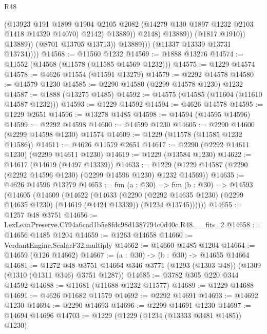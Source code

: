 \begin{lexlean}{R48}
\begin{coremodule}
                                  (@13923
                                    @191
                                    @1899
                                    @1904
                                    @2105
                                    @2082
                                    (@14279 @130 @1897 @1232 @2103 @1418 @14320 @14070)
                                    @2142)
                                  @13889))
                              @2148)
                            @13889))
                        (@1817 @1910))
                      @13889))
                  (@8701 @13705 @13713))
                @13889)))
          (@11337 @13339 @13731 @13734))))
@14568 := @11560 @1232
@14569 := @1888 @13276
@14574 := @11552 (@14568 (@11578 (@11585 @14569 @1232)))
@14575 := @1229 @14574
@14578 := @4626 @11554 (@11591 @13279)
@14579 := @2292 @14578
@14580 := @14579 @1230
@14585 := @2290 @14580 (@2299 @14578 @1230) @1232
@14587 := @1888 (@13275 @1485)
@14592 := @14575 (@14585 (@11604 (@11610 @14587 @1232)))
@14593 := @1229 @14592
@14594 := @4626 @14578
@14595 := @1229 @2651
@14596 := @13278 @1485
@14598 := @14594 (@14595 @14596)
@14599 := @2292 @14598
@14600 := @14599 @1230
@14605 := @2290 @14600 (@2299 @14598 @1230) @11574
@14609 := @1229 (@11578 (@11585 @1232 @11586))
@14611 := @4626 @11579 @2651
@14617 := @2290 (@2292 @14611 @1230) (@2299 @14611 @1230)
@14619 := @1229 (@13584 @1230)
@14622 := @14617 (@14619 (@4497 @13339))
@14633 := @1229 (@1229 @14587 (@2290 (@2292 @14596 @1230) (@2299 @14596 @1230) @1232 @14569))
@14635 := @4626 @14596 @13279
@14653 := fun (a : @30) =>
  fun (b : @30) =>
  @14593
    (@14605
      (@14609
        (@14622
          (@14633
            (@2290
              (@2292 @14635 @1230)
              (@2299 @14635 @1230)
              (@14619 (@4424 @13339))
              (@1234 @13745))))))
@14655 := @1257 @48 @3751
@14656 := LexLeanPreserve.C794a6cad1b5e8fdc98d1387794c0d40c.R48.__fits_2
@14658 := @14656 @1485 @1204
@14659 := @1263 @14658
@14660 := VerdantEngine.ScalarF32.multiply
@14662 := @14660 @1485 @1204
@14664 := @14659 (@126 @14662)
@14667 := (a : @30) -> (b : @30) -> @14655 @14664
@14681 := @1272
    @48
    @3751
    @14664
    @346
    @3771
    (@1293 (@1303 @48))
    (@1309 (@1310 (@1311 @346) @3751 @1287))
@14685 := @3782 @305 @220 @344 @14592
@14688 := @11681 (@11688 @1232 @11577)
@14689 := @1229 @14688
@14691 := @4626 @11682 @11579
@14692 := @2292 @14691
@14693 := @14692 @1230
@14694 := @2290 @14693
@14696 := @2299 @14691 @1230
@14697 := @14694 @14696
@14703 := @1229 (@1229 (@1234 (@13333 @3481 @1485)) @1230)

\end{coremodule}
\end{lexlean}
